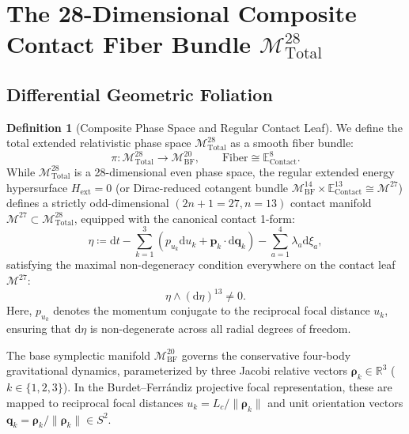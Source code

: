 \documentclass[11pt,a4paper,reqno]{article}
\theoremstyle{plain}
\theoremstyle{definition}
\newtheorem{definition}[theorem]{Definition}
\theoremstyle{remark}
\numberwithin{equation}{section}
\numberwithin{table}{section}
\newcommand{\MbfTwenty}{\mathcal{M}_{\mathrm{BF}}^{20}}
\newcommand{\Econtact}{\mathbb{E}_{\mathrm{Contact}}^8}
\newcommand{\Mtotal}{\mathcal{M}_{\mathrm{Total}}^{28}}
\providecommand{\diff}{\mathrm{d}}
\begin{document}
\section{The 28-Dimensional Composite Contact Fiber Bundle \texorpdfstring{$\Mtotal$}{M Total(28)}}
\label{sec:contact_fiber_bundle}

\subsection{Differential Geometric Foliation}
\begin{definition}[Composite Phase Space and Regular Contact Leaf]
We define the total extended relativistic phase space $\Mtotal$ as a smooth fiber bundle:
\begin{equation}
  \pi \colon \Mtotal \longrightarrow \MbfTwenty, \qquad \mathrm{Fiber} \cong \Econtact.
  \label{eq:bundle_projection}
\end{equation}
While $\Mtotal$ is a 28-dimensional even phase space, the regular extended energy hypersurface $H_{\mathrm{ext}} = 0$ (or Dirac-reduced cotangent bundle $\mathcal{M}_{\mathrm{BF}}^{14} \times \mathbb{E}_{\mathrm{Contact}}^{13} \cong \mathcal{M}^{27}$) defines a strictly odd-dimensional $(2n+1 = 27, n=13)$ contact manifold $\mathcal{M}^{27} \subset \Mtotal$, equipped with the canonical contact 1-form:
\begin{equation}
  \eta \coloneqq \diff t - \sum_{k=1}^3 \left( p_{u_k} \diff u_k + \bm{p}_k \cdot \diff\bm{q}_k \right) - \sum_{a=1}^4 \lambda_a \diff\xi_a,
  \label{eq:contact_1form_def}
\end{equation}
satisfying the maximal non-degeneracy condition everywhere on the contact leaf $\mathcal{M}^{27}$:
\begin{equation}
  \eta \wedge (\diff\eta)^{13} \ne 0.
\end{equation}
Here, $p_{u_k}$ denotes the momentum conjugate to the reciprocal focal distance $u_k$, ensuring that $\diff\eta$ is non-degenerate across all radial degrees of freedom.
\end{definition}

The base symplectic manifold $\MbfTwenty$ governs the conservative four-body gravitational dynamics, parameterized by three Jacobi relative vectors $\bm{\rho}_k \in \mathbb{R}^3$ ($k \in \{1, 2, 3\}$). In the Burdet--Ferr\'andiz projective focal representation, these are mapped to reciprocal focal distances $u_k = L_c / \|\bm{\rho}_k\|$ and unit orientation vectors $\bm{q}_k = \bm{\rho}_k / \|\bm{\rho}_k\| \in S^2$.
\end{document}
